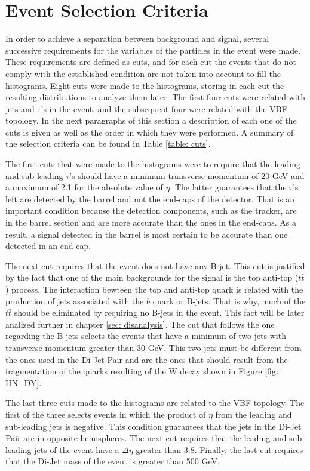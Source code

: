 \section{Event Selection Criteria}

In order to achieve a separation between background and signal, several successive requirements for the variables of the particles in the event were made. These requirements are defined as cuts, and for each cut the events that do not comply with the established condition are not taken into account to fill the histograms. Eight cuts were made to the histograms, storing in each cut the resulting distributions to analyze them later. The first four cuts were related with jets and $\tau$'s in the event, and the subsequent four were related with the VBF topology. In the next paragraphs of this section a description of each one of the cuts is given as well as the order in which they were performed. A summary of the selection criteria can be found in Table \ref{table: cuts}.

The first cuts that were made to the histograms were to require that the leading and sub-leading $\tau$'s should have a minimum transverse momentum of 20 GeV and a maximum of 2.1 for the absolute value of $\eta$. The latter guarantees that the $\tau$'s left are detected by the barrel and not the end-caps of the detector. That is an important condition because the detection components, such as the tracker, are in the barrel section and are more accurate than the ones in the end-caps. As a result, a signal detected in the barrel is most certain to be accurate than one detected in an end-cap.  

The next cut requires that the event does not have any B-jet. This cut is justified by the fact that one of the main backgrounds for the signal is the top anti-top ($t\bar{t}$) process. The interaction bewteen the top and anti-top quark is related with the production of jets associated with the $b$ quark or B-jets. That is why, much of the $t\bar{t}$ should be eliminated by requiring no B-jets in the event. This fact will be later analized further in chapter \ref{sec: disanalysis}. The cut that follows the one regarding the B-jets selects the events that have a minimum of two jets with transverse momentum greater than 30 GeV. This two jets must be different from the ones used in the Di-Jet Pair and are the ones that should result from the fragmentation of the quarks resulting of the W decay shown in Figure \ref{fig: HN_DY}.

The last three cuts made to the histograms are related to the VBF topology. The first of the three selects events in which the product of $\eta$ from the leading and sub-leading jets is negative. This condition guarantees that the jets in the Di-Jet Pair are in opposite hemispheres. The next cut requires that the leading and sub-leading jets of the event have a $\Delta \eta$ greater than 3.8. Finally, the last cut requires that the Di-Jet mass of the event is greater than 500 GeV.

